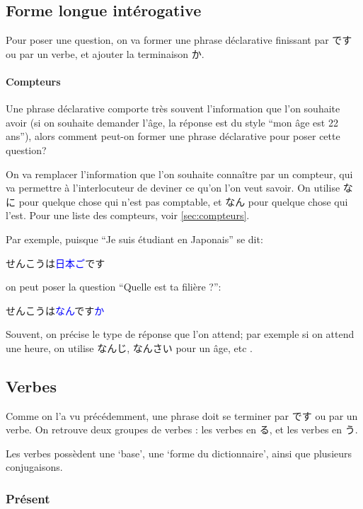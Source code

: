 \documentclass[a4paper,10pt,french,openany]{memoir}
\newcommand{\term}[1]{\textcolor{blue}{#1}}
\begin{document}
\subsection{Forme longue intérogative}

Pour poser une question, on va former une phrase déclarative finissant par です ou par un verbe, et ajouter la terminaison か.

\paragraph{Compteurs}

Une phrase déclarative comporte très souvent l'information que l'on souhaite avoir (si on souhaite demander l'âge, la réponse est du style ``mon âge est 22 ans''), alors comment peut-on former une phrase déclarative pour poser cette question?

On va remplacer l'information que l'on souhaite connaître par un compteur, qui va permettre à l'interlocuteur de deviner ce qu'on l'on veut savoir. On utilise なに pour quelque chose qui n'est pas comptable, et なん pour quelque chose qui l'est.
Pour une liste des compteurs, voir \cref{sec:compteurs}.

Par exemple, puisque ``Je suis étudiant en Japonais'' se dit:
\begin{center}
 せんこうは\term{日本ご}です
\end{center}
on peut poser la question ``Quelle est ta filière ?'':
\begin{center}
 せんこうは\term{なん}です\term{か}
\end{center}

Souvent, on précise le type de réponse que l'on attend; par exemple si on attend une heure, on utilise なんじ, なんさい pour un âge, etc .

\subsection{Verbes}

Comme on l'a vu précédemment, une phrase doit se terminer par です ou par un verbe.
On retrouve deux groupes de verbes : les verbes en る, et les verbes en う.

Les verbes possèdent une `base', une `forme du dictionnaire', ainsi que plusieurs conjugaisons.

\subsubsection{Présent}
\end{document}

